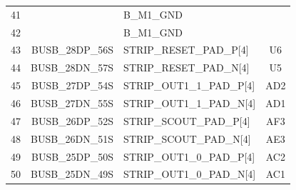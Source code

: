 \documentclass[11pt]{article}
\begin{document}
\begin{table}
\begin{center}
\begin{tabular}{|c|r|l|c|}
41 &                 &  B\_M1\_GND                &      \\
42 &                 &  B\_M1\_GND                &      \\ \hline
43 &   BUSB\_28DP\_56S &  STRIP\_RESET\_PAD\_P[4]    & U6  \\
44 &   BUSB\_28DN\_57S &  STRIP\_RESET\_PAD\_N[4]    & U5  \\ \hline
45 &   BUSB\_27DP\_54S &  STRIP\_OUT1\_1\_PAD\_P[4]   & AD2  \\
46 &   BUSB\_27DN\_55S &  STRIP\_OUT1\_1\_PAD\_N[4]   & AD1  \\ \hline
47 &   BUSB\_26DP\_52S &  STRIP\_SCOUT\_PAD\_P[4]    & AF3  \\
48 &   BUSB\_26DN\_51S &  STRIP\_SCOUT\_PAD\_N[4]    & AE3  \\ \hline
49 &   BUSB\_25DP\_50S &  STRIP\_OUT1\_0\_PAD\_P[4]   & AC2  \\
50 &   BUSB\_25DN\_49S &  STRIP\_OUT1\_0\_PAD\_N[4]   & AC1  \\ \hline
\end{tabular}
\end{center}
\end{table}
\end{document}
